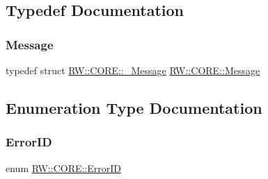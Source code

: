 \subsection{Typedef Documentation}
\hypertarget{namespace_r_w_1_1_c_o_r_e_a571834b44d0e3fab58aa6abfe5a02988}{}\label{namespace_r_w_1_1_c_o_r_e_a571834b44d0e3fab58aa6abfe5a02988} 
\subsubsection{\texorpdfstring{Message}{Message}}
{\footnotesize\ttfamily typedef struct \hyperlink{struct_r_w_1_1_c_o_r_e_1_1___message}{R\+W\+::\+C\+O\+R\+E\+::\+\_\+\+Message} \hyperlink{namespace_r_w_1_1_c_o_r_e_a571834b44d0e3fab58aa6abfe5a02988}{R\+W\+::\+C\+O\+R\+E\+::\+Message}}



\subsection{Enumeration Type Documentation}
\hypertarget{namespace_r_w_1_1_c_o_r_e_adc31704b5171629bde8ad1b0badc49d4}{}\label{namespace_r_w_1_1_c_o_r_e_adc31704b5171629bde8ad1b0badc49d4} 
\subsubsection{\texorpdfstring{Error\+ID}{ErrorID}\hspace{0.1cm}{\footnotesize\ttfamily [1/2]}}
{\footnotesize\ttfamily enum \hyperlink{namespace_r_w_1_1_c_o_r_e_adc31704b5171629bde8ad1b0badc49d4}{R\+W\+::\+C\+O\+R\+E\+::\+Error\+ID}\hspace{0.3cm}{\ttfamily [strong]}}

